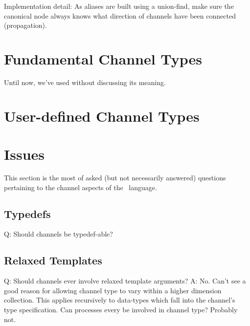Implementation detail: 
As aliases are built using a union-find, make sure the canonical node
always knows what direction of channels have been connected (propagation).  

\section{Fundamental Channel Types}
\label{sec:channels:fundamental}

Until now, we've used  without discussing its meaning.  


\section{User-defined Channel Types}
\label{sec:channels:userdef}

\section{Issues}
\label{sec:channels:issues}

This section is the most of asked (but not necessarily answered) questions
pertaining to the channel aspects of the \hac\ language.  

\subsection{Typedefs}
\label{sec:channels:typedefs}

Q: Should channels be typedef-able?

\subsection{Relaxed Templates}
\label{sec:channels:relaxed_templates}

Q: Should channels ever involve relaxed template arguments?
A: No.  Can't see a good reason for allowing channel type to vary
	within a higher dimension collection.  This applies recursively
	to data-types which fall into the channel's type specification.  
	Can processes every be involved in channel type?  Probably not.  

